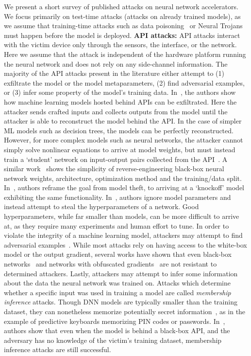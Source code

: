 We present a short survey of published attacks on neural network accelerators. We focus primarily on test-time attacks (attacks on already trained models), as we assume that training-time attacks such as data poisoning~ or Neural Trojans~ must happen before the model is deployed. 
\noindent \textbf{API attacks:}
API attacks interact with the victim device only through the sensors, the interface, or the network. 
Here we assume that the attack is independent of the hardware platform running the neural network and does not rely on any side-channel information.
The majority of the API attacks present in the literature either attempt to (1) exfiltrate the model or the model metaparameters, (2) find adversarial examples, or (3) infer some property of the model's training data.
In~, the authors show how machine learning models hosted behind APIs can be exfiltrated. Here the attacker sends crafted inputs and collects outputs from the model until the attacker is able to reconstruct the model behind the API. In the case of simpler ML models such as decision trees, the models can be perfectly reconstructed. However, for more complex models such as neural networks, the attacker cannot simply solve nonlinear equations to arrive at model weights, but must instead train a `student' network on input-output pairs collected from the API~. A similar work~ shows the simplicity of reverse-engineering black-box neural network weights, architecture, optimization method and the training/data split. In~, authors reframe the goal from model theft, to arriving at a `knockoff' model exhibiting the same functionality.  In~, authors ignore model parameters and instead attempt to steal the hyperparameters of a network. Good hyperparameters, while far smaller than models, can be more difficult to arrive at, as they require many experiments and human effort to tune. 
In order to violate the integrity of a machine learning model, attackers may attempt to find adversarial examples~. While most attacks rely on having access to the white-box model or the output gradient, several works have shown that even black-box networks~ and networks with obfuscated gradients~ are not resistant to determined attackers.
Lastly, attackers may attempt to infer some information about the data the neural network was trained on. Attacks which determine whether a specific input was used in training a model are called \textit{membership inference} attacks. Though DNN models are typically smaller than the training dataset, they can nonetheless memorize potentially secret information~, as in the example of predictive keyboards memorizing PIN codes or passwords. In~, authors show that even when the model is behind a black-box API, and the adversary has no knowledge of the victim's training dataset, membership inference attacks are still successful.
